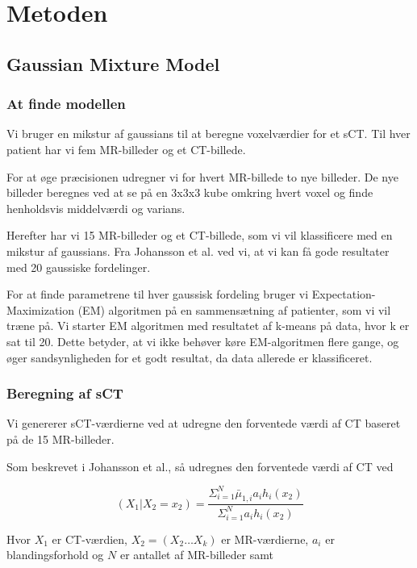 \section{Metoden}
\subsection{Gaussian Mixture Model}

\subsubsection{At finde modellen}
Vi bruger en mikstur af gaussians til at beregne voxelværdier
for et sCT. Til hver patient har vi fem MR-billeder og et CT-billede.

For at øge præcisionen udregner vi for hvert MR-billede
to nye billeder. De nye billeder beregnes ved at se på en 3x3x3
kube omkring hvert voxel og finde henholdsvis middelværdi og varians.

Herefter har vi 15 MR-billeder og et CT-billede, som vi vil klassificere
med en mikstur af gaussians. Fra Johansson et al. ved vi, at vi kan få
gode resultater med 20 gaussiske fordelinger. 

For at finde parametrene til hver gaussisk fordeling bruger vi
Ex\-pecta\-tion-Maximization (EM) algoritmen på en sammensætning af patienter, som
vi vil træne på. Vi starter EM algoritmen med resultatet af k-means på
data, hvor k er sat til 20. Dette betyder, at vi ikke behøver køre
EM-algoritmen flere gange, og øger sandsynligheden for et godt resultat, da
data allerede er klassificeret.

\subsubsection{Beregning af sCT}

Vi genererer sCT-værdierne ved at udregne den forventede værdi af CT baseret på de 15 MR-billeder. 

Som beskrevet i Johansson et al., så udregnes den forventede værdi af CT ved

\begin{equation}
(X_1 | X_2 = x_2) = \frac{\Sigma^{N}_{i=1} \bar{\mu}_{1,i} a_i h_i(x_2)}{\Sigma^{N}_{i=1} a_i h_i(x_2)}
\end{equation}

Hvor $X_1$ er CT-værdien, $X_2 = (X_2 \dots X_k)$ er MR-værdierne, $a_i$ er blandingsforhold og $N$ er antallet af MR-billeder samt


